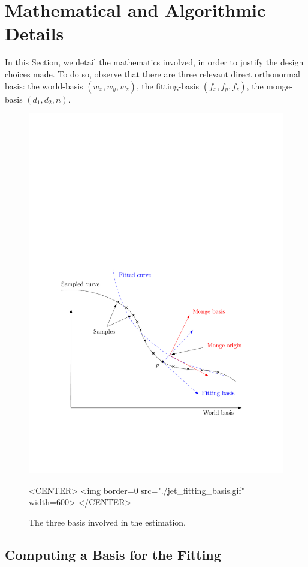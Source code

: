 

\section{Mathematical and Algorithmic Details}
\label{sec:details}
In this Section, we detail the mathematics involved, in order to
justify the design choices made.
To do so, observe that there are three relevant direct orthonormal
basis: the world-basis $(w_x,w_y,w_z)$, the fitting-basis
$(f_x,f_y,f_z)$, the monge-basis $(d_1,d_2,n)$.

\begin{figure}[!ht]
\begin{ccTexOnly}
\centerline{
\includegraphics[width=.5\linewidth]{Jet_fitting_3/jet_fitting_basis}}
\end{ccTexOnly}

\label{fig:jet_fitting_basis}
\caption{The three basis involved in the estimation.}

\begin{ccHtmlOnly}
<CENTER>
<img border=0 src="./jet_fitting_basis.gif" width=600>
</CENTER>
\end{ccHtmlOnly}
\end{figure}

\subsection{Computing a Basis for the Fitting}

